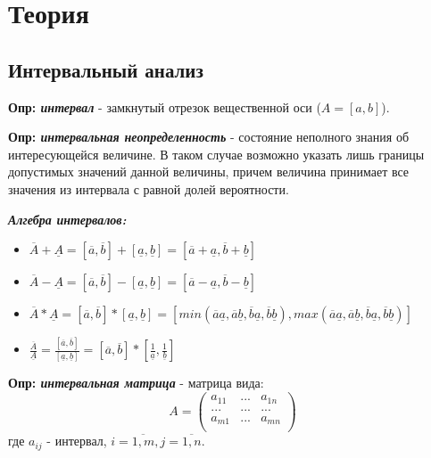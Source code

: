 \documentclass[12pt,a4paper]{article}
\begin{document}
\section{Теория}
\subsection{Интервальный анализ}
\textbf{Опр: \textit{интервал}} - замкнутый отрезок вещественной оси ($A=[a,b]$).

\textbf{Опр: \textit{интервальная неопределенность}} - состояние неполного знания об интересующейся величине. В таком случае возможно указать лишь границы допустимых значений данной величины, причем величина принимает все значения из интервала с равной долей вероятности.

\begin{center}
    \textbf{\textit{Алгебра интервалов:}}
\end{center}
\begin{itemize}
    \item $\overline{A}+\underline{A}=[\overline{a},\overline{b}]+[\underline{a},\underline{b}]=[\overline{a}+\underline{a},\overline{b}+\underline{b}]$
    \item $\overline{A}-\underline{A}=[\overline{a},\overline{b}]-[\underline{a},\underline{b}]=[\overline{a}-\underline{a},\overline{b}-\underline{b}]$
    \item $\overline{A}*\underline{A}=[\overline{a},\overline{b}]*[\underline{a},\underline{b}]=[min(\overline{a}\underline{a},\overline{a}\underline{b},\overline{b}\underline{a},\overline{b}\underline{b}),max(\overline{a}\underline{a},\overline{a}\underline{b},\overline{b}\underline{a},\overline{b}\underline{b})]$
    \item $\frac{\overline{A}}{\underline{A}}=\frac{[\overline{a},\overline{b}]}{[\underline{a},\underline{b}]}=[\overline{a},\overline{b}]*[\frac{1}{\underline{a}},\frac{1}{\underline{b}}]$
\end{itemize}

\textbf{Опр: \textit{интервальная матрица}} - матрица вида:
\begin{equation}
    A=
        \begin{pmatrix}
            a_{11} & ... & a_{1n}\\
            ... & ... & ...\\
            a_{m1} & ... & a_{mn}\\
        \end{pmatrix}
\end{equation}
где $a_{ij}$ - интервал, $i=\overline{1,m},j=\overline{1,n}$.
\end{document}
